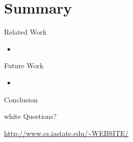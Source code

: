 \section*{Summary}

\begin{frame}{Related Work}
  \begin{itemize}
    \item %
  \end{itemize}
\end{frame}


\begin{frame}{Future Work}
  \begin{itemize}
    \item %
  \end{itemize}
\end{frame}


\begin{frame}{Conclusion}
\end{frame}


\begin{frame}
\begin{beamercolorbox}[center]{white}
  {\Large Questions?}

  \vspace{2em}\hfill

  \url{http://www.cs.iastate.edu/~WEBSITE/}
\end{beamercolorbox}
\end{frame}

